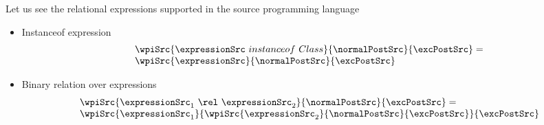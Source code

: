 Let us see the relational expressions supported in the source programming language

\begin{itemize} 
     \item Instanceof expression
	        $$ \begin{array}{l} \wpiSrc{ \expressionSrc \ instanceof \ Class }{\normalPostSrc }{ \excPostSrc } = \\
	                \wpiSrc{ \expressionSrc  }{ \normalPostSrc }{ \excPostSrc }
	            \end{array} $$

     \item Binary relation over expressions
            $$ \begin{array}{l} \wpiSrc{ \expressionSrc_1 \ \rel \ \expressionSrc_2 }{\normalPostSrc }{ \excPostSrc } = \\
	                \wpiSrc{ \expressionSrc_1  }{  \wpiSrc{ \expressionSrc_2  }{ \normalPostSrc }{ \excPostSrc }  }{ \excPostSrc }
	            \end{array} $$
\end{itemize}


